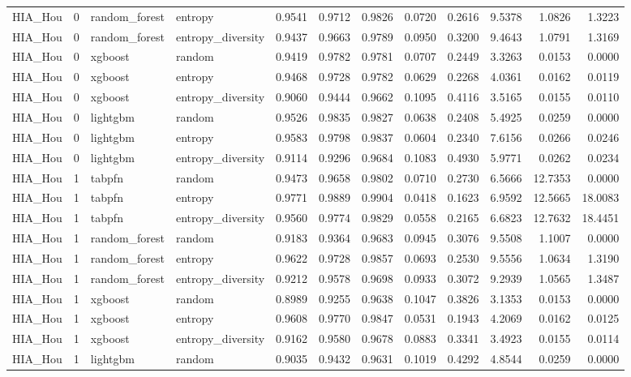 \begin{tabular}{lrllrrrrrrrr}
HIA_Hou & 0 & random_forest & entropy & 0.9541 & 0.9712 & 0.9826 & 0.0720 & 0.2616 & 9.5378 & 1.0826 & 1.3223 \\
HIA_Hou & 0 & random_forest & entropy_diversity & 0.9437 & 0.9663 & 0.9789 & 0.0950 & 0.3200 & 9.4643 & 1.0791 & 1.3169 \\
HIA_Hou & 0 & xgboost & random & 0.9419 & 0.9782 & 0.9781 & 0.0707 & 0.2449 & 3.3263 & 0.0153 & 0.0000 \\
HIA_Hou & 0 & xgboost & entropy & 0.9468 & 0.9728 & 0.9782 & 0.0629 & 0.2268 & 4.0361 & 0.0162 & 0.0119 \\
HIA_Hou & 0 & xgboost & entropy_diversity & 0.9060 & 0.9444 & 0.9662 & 0.1095 & 0.4116 & 3.5165 & 0.0155 & 0.0110 \\
HIA_Hou & 0 & lightgbm & random & 0.9526 & 0.9835 & 0.9827 & 0.0638 & 0.2408 & 5.4925 & 0.0259 & 0.0000 \\
HIA_Hou & 0 & lightgbm & entropy & 0.9583 & 0.9798 & 0.9837 & 0.0604 & 0.2340 & 7.6156 & 0.0266 & 0.0246 \\
HIA_Hou & 0 & lightgbm & entropy_diversity & 0.9114 & 0.9296 & 0.9684 & 0.1083 & 0.4930 & 5.9771 & 0.0262 & 0.0234 \\
HIA_Hou & 1 & tabpfn & random & 0.9473 & 0.9658 & 0.9802 & 0.0710 & 0.2730 & 6.5666 & 12.7353 & 0.0000 \\
HIA_Hou & 1 & tabpfn & entropy & 0.9771 & 0.9889 & 0.9904 & 0.0418 & 0.1623 & 6.9592 & 12.5665 & 18.0083 \\
HIA_Hou & 1 & tabpfn & entropy_diversity & 0.9560 & 0.9774 & 0.9829 & 0.0558 & 0.2165 & 6.6823 & 12.7632 & 18.4451 \\
HIA_Hou & 1 & random_forest & random & 0.9183 & 0.9364 & 0.9683 & 0.0945 & 0.3076 & 9.5508 & 1.1007 & 0.0000 \\
HIA_Hou & 1 & random_forest & entropy & 0.9622 & 0.9728 & 0.9857 & 0.0693 & 0.2530 & 9.5556 & 1.0634 & 1.3190 \\
HIA_Hou & 1 & random_forest & entropy_diversity & 0.9212 & 0.9578 & 0.9698 & 0.0933 & 0.3072 & 9.2939 & 1.0565 & 1.3487 \\
HIA_Hou & 1 & xgboost & random & 0.8989 & 0.9255 & 0.9638 & 0.1047 & 0.3826 & 3.1353 & 0.0153 & 0.0000 \\
HIA_Hou & 1 & xgboost & entropy & 0.9608 & 0.9770 & 0.9847 & 0.0531 & 0.1943 & 4.2069 & 0.0162 & 0.0125 \\
HIA_Hou & 1 & xgboost & entropy_diversity & 0.9162 & 0.9580 & 0.9678 & 0.0883 & 0.3341 & 3.4923 & 0.0155 & 0.0114 \\
HIA_Hou & 1 & lightgbm & random & 0.9035 & 0.9432 & 0.9631 & 0.1019 & 0.4292 & 4.8544 & 0.0259 & 0.0000 \\

\end{tabular}
